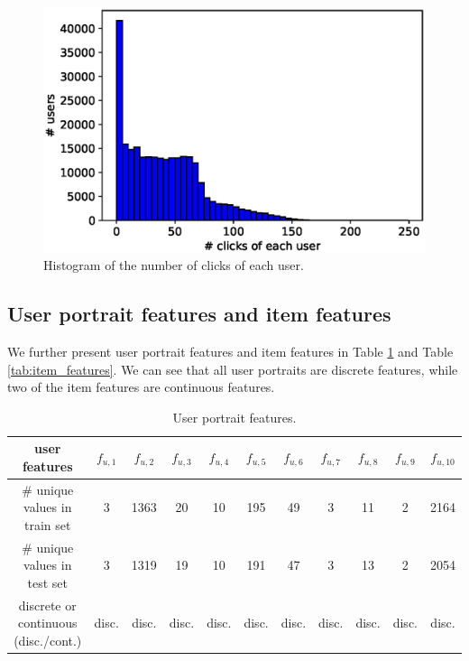 \begin{figure}[t!]
    \centering
    \includegraphics[width=0.8\linewidth]{figures/analysis/click.eps}
    \caption{Histogram of the number of clicks of each user.}
    \label{fig:analysis:click}
\end{figure}


\subsection{User portrait features and item features}
We further present user portrait features and item features in Table \ref{tab:user_portrait} and Table \ref{tab:item_features}.
We can see that all user portraits are discrete features, while two of the item features are continuous features.

\begin{table}[t!]
    \centering
    \caption{User portrait features.}
    \begin{tabular}{c|c|c|c|c|c|c|c|c|c|c}
    \hline
    {\textbf{user features}} & 
    { $f_{u,1}$} & 
    { $f_{u,2}$} & 
    { $f_{u,3}$} & 
    { $f_{u,4}$} & 
    { $f_{u,5}$} & 
    { $f_{u,6}$} & 
    { $f_{u,7}$} & 
    { $f_{u,8}$} & 
    { $f_{u,9}$} & 
    { $f_{u,10}$} \\ \hline
    { \# unique values in train set} & 3 & { 1363} & { 20} & { 10} & { 195} & { 49} & { 3} & { 11} & { 2} & { 2164} \\ \hline
    { \# unique values in test set} & 3 & { 1319} & { 19} & { 10} & { 191} & { 47} & { 3} & { 13} & { 2} & { 2054} \\ \hline
    discrete or continuous (disc./cont.) & disc. & disc. & disc. & disc. & disc. & disc. & disc. & disc. & disc. & disc. \\ \hline
    \end{tabular}
    \label{tab:user_portrait}
\end{table}



